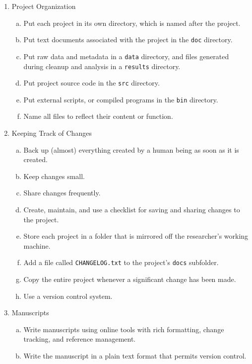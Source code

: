 \documentclass[10pt,letterpaper]{article}
\begin{document}
{\begin{enumerate}
\item Project Organization
  \begin{enumerate}[a)]
  \item Put each project in its own directory, which is named after the project.
  \item Put text documents associated with the project in the \texttt{doc} directory.
  \item Put raw data and metadata in a \texttt{data} directory, and files generated during cleanup and analysis in a \texttt{results} directory.
  \item Put project source code in the \texttt{src} directory.
  \item Put external scripts, or compiled programs in the \texttt{bin} directory.
  \item Name all files to reflect their content or function.
  \end{enumerate}

\item Keeping Track of Changes
  \begin{enumerate}[a)]
  \item Back up (almost) everything created by a human being as soon as it is created.
  \item Keep changes small.
  \item Share changes frequently.
  \item Create, maintain, and use a checklist for saving and sharing changes to the project.
  \item Store each project in a folder that is mirrored off the researcher's working machine.
  \item Add a file called \texttt{CHANGELOG.txt} to the project's \texttt{docs} subfolder.
  \item Copy the entire project whenever a significant change has been made.
  \item Use a version control system.
  \end{enumerate}

\item Manuscripts
  \begin{enumerate}[a)]
  \item Write manuscripts using online tools with rich formatting, change tracking, and reference management.
  \item Write the manuscript in a plain text format that permits version control.
  \end{enumerate}
\end{enumerate}
}
\end{document}
